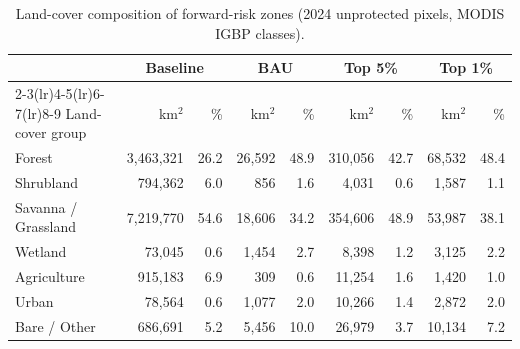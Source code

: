 \begin{table}[htbp]
  \centering
  \small
  \caption{Land-cover composition of forward-risk zones (2024 unprotected pixels, MODIS IGBP classes).}
  \label{tab:landcover_exposure}
  \begin{tabular}{lrrrrrrrr}
    \toprule
    & \multicolumn{2}{c}{Baseline} & \multicolumn{2}{c}{BAU} & \multicolumn{2}{c}{Top 5\%} & \multicolumn{2}{c}{Top 1\%} \\
    \cmidrule(lr){2-3}\cmidrule(lr){4-5}\cmidrule(lr){6-7}\cmidrule(lr){8-9}
    Land-cover group & km$^2$ & \% & km$^2$ & \% & km$^2$ & \% & km$^2$ & \% \\
    \midrule
    Forest & 3,463,321 & 26.2 & 26,592 & 48.9 & 310,056 & 42.7 & 68,532 & 48.4 \\
    Shrubland & 794,362 & 6.0 & 856 & 1.6 & 4,031 & 0.6 & 1,587 & 1.1 \\
    Savanna / Grassland & 7,219,770 & 54.6 & 18,606 & 34.2 & 354,606 & 48.9 & 53,987 & 38.1 \\
    Wetland & 73,045 & 0.6 & 1,454 & 2.7 & 8,398 & 1.2 & 3,125 & 2.2 \\
    Agriculture & 915,183 & 6.9 & 309 & 0.6 & 11,254 & 1.6 & 1,420 & 1.0 \\
    Urban & 78,564 & 0.6 & 1,077 & 2.0 & 10,266 & 1.4 & 2,872 & 2.0 \\
    Bare / Other & 686,691 & 5.2 & 5,456 & 10.0 & 26,979 & 3.7 & 10,134 & 7.2 \\
    \bottomrule
  \end{tabular}
\end{table}
